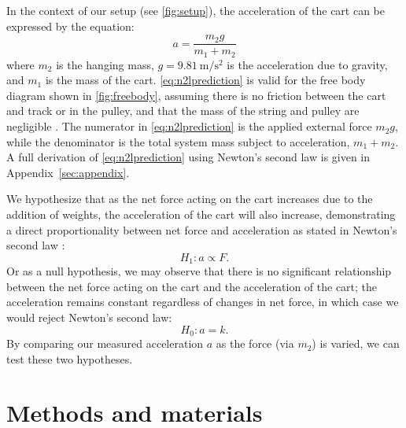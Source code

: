 ﻿\documentclass[reprint,amsmath,amssymb,aps]{revtex4-2}
\begin{document}
In the context of our setup (see \cref{fig:setup}), the acceleration of the cart can be expressed by the equation:
\begin{equation}
a = \frac{m_2 g}{m_1 + m_2}
\label{eq:n2lprediction}
\end{equation}
where $m_2$ is the hanging mass, $g=\qty{9.81}{\meter\per\second\squared}$ is the acceleration due to gravity, and $m_1$ is the mass of the cart. \cref{eq:n2lprediction} is valid for the free body diagram shown in \cref{fig:freebody}, assuming there is no friction between the cart and track or in the pulley, and that the mass of the string and pulley are negligible \cite{tipler}.  The numerator in \cref{eq:n2lprediction} is the applied external force $m_2 g$, while the denominator is the total system mass subject to acceleration, $m_1+m_2$.  A full derivation of \cref{eq:n2lprediction} using Newton's second law is given in Appendix~\ref{sec:appendix}. 

We hypothesize that as the net force acting on the cart increases due to the addition of weights, the acceleration of the cart will also increase, demonstrating a direct proportionality between net force and acceleration as stated in Newton's second law \cite{tipler}:
\begin{equation}
H_1: a \propto F.
\end{equation}
Or as a null hypothesis, we may observe that there is no significant relationship between the net force acting on the cart and the acceleration of the cart; the acceleration remains constant regardless of changes in net force, in which case we would reject Newton's second law:
\begin{equation}
H_0: a = k.
\end{equation}
By comparing our measured acceleration $a$ as the force (via $m_2$) is varied, we can test these two hypotheses. 









\section{Methods and materials}
\end{document}
